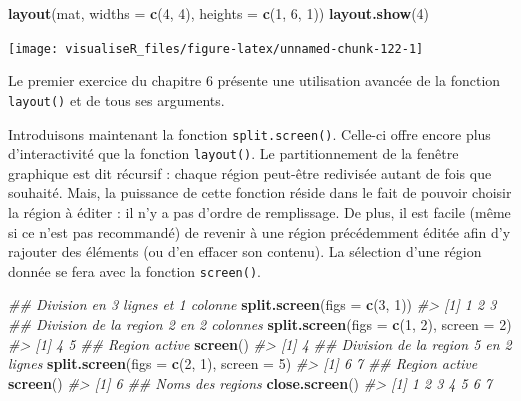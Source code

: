 \documentclass[]{article}
\newenvironment{Shaded}{\begin{snugshade}}{\end{snugshade}}
\newcommand{\CommentTok}[1]{\textcolor[rgb]{0.56,0.35,0.01}{\textit{#1}}}
\newcommand{\DataTypeTok}[1]{\textcolor[rgb]{0.13,0.29,0.53}{#1}}
\newcommand{\DecValTok}[1]{\textcolor[rgb]{0.00,0.00,0.81}{#1}}
\newcommand{\KeywordTok}[1]{\textcolor[rgb]{0.13,0.29,0.53}{\textbf{#1}}}
\newcommand{\NormalTok}[1]{#1}
\begin{document}
\begin{Shaded}
\begin{Highlighting}[]
\KeywordTok{layout}\NormalTok{(mat, }\DataTypeTok{widths =} \KeywordTok{c}\NormalTok{(}\DecValTok{4}\NormalTok{, }\DecValTok{4}\NormalTok{), }\DataTypeTok{heights =} \KeywordTok{c}\NormalTok{(}\DecValTok{1}\NormalTok{, }\DecValTok{6}\NormalTok{, }\DecValTok{1}\NormalTok{))}
\KeywordTok{layout.show}\NormalTok{(}\DecValTok{4}\NormalTok{)}
\end{Highlighting}
\end{Shaded}

\begin{center}\texttt{[image: visualiseR\_files/figure-latex/unnamed-chunk-122-1]} \end{center}

Le premier exercice du chapitre 6 présente une utilisation avancée de la fonction \texttt{layout()} et de tous ses arguments.

Introduisons maintenant la fonction \texttt{split.screen()}. Celle-ci offre encore plus
d'interactivité que la fonction \texttt{layout()}. Le partitionnement de la fenêtre
graphique est dit récursif : chaque région peut-être redivisée autant de fois
que souhaité. Mais, la puissance de cette fonction réside dans le fait de
pouvoir choisir la région à éditer : il n'y a pas d'ordre de remplissage. De
plus, il est facile (même si ce n'est pas recommandé) de revenir à une région
précédemment éditée afin d'y rajouter des éléments (ou d'en effacer son
contenu). La sélection d'une région donnée se fera avec la fonction \texttt{screen()}.

\begin{Shaded}
\begin{Highlighting}[]
\CommentTok{## Division en 3 lignes et 1 colonne}
\KeywordTok{split.screen}\NormalTok{(}\DataTypeTok{figs =} \KeywordTok{c}\NormalTok{(}\DecValTok{3}\NormalTok{, }\DecValTok{1}\NormalTok{))}
\CommentTok{#> [1] 1 2 3}
\CommentTok{## Division de la region 2 en 2 colonnes}
\KeywordTok{split.screen}\NormalTok{(}\DataTypeTok{figs =} \KeywordTok{c}\NormalTok{(}\DecValTok{1}\NormalTok{, }\DecValTok{2}\NormalTok{), }\DataTypeTok{screen =} \DecValTok{2}\NormalTok{)}
\CommentTok{#> [1] 4 5}
\CommentTok{## Region active}
\KeywordTok{screen}\NormalTok{()}
\CommentTok{#> [1] 4}
\CommentTok{## Division de la region 5 en 2 lignes}
\KeywordTok{split.screen}\NormalTok{(}\DataTypeTok{figs =} \KeywordTok{c}\NormalTok{(}\DecValTok{2}\NormalTok{, }\DecValTok{1}\NormalTok{), }\DataTypeTok{screen =} \DecValTok{5}\NormalTok{)}
\CommentTok{#> [1] 6 7}
\CommentTok{## Region active}
\KeywordTok{screen}\NormalTok{()}
\CommentTok{#> [1] 6}
\CommentTok{## Noms des regions}
\KeywordTok{close.screen}\NormalTok{()}
\CommentTok{#> [1] 1 2 3 4 5 6 7}
\end{Highlighting}
\end{Shaded}
\end{document}
